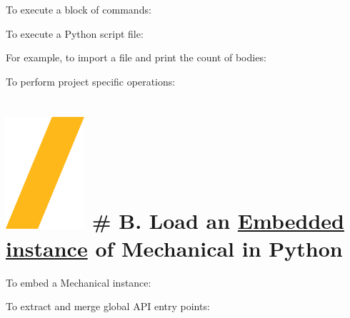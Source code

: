 \documentclass[9pt,landscape]{article}
\begin{document}
\begin{multicols}{3}

To execute a block of commands:


To execute a Python script file:


For example, to import a file and print the count of bodies:




To perform project specific operations:




\section{\includegraphics[height=\fontcharht\font`\S]{slash.png} # B. Load an  \underline{Embedded instance}  of Mechanical in Python}
To embed a Mechanical instance: 


To extract and merge global API entry points:



\end{multicols}
\end{document}
